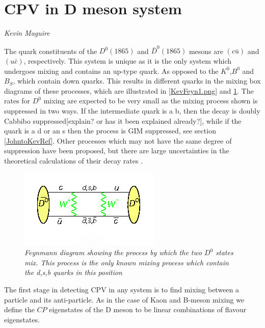 \section{CPV in D meson system}
\vspace{-1.0em}
\begin{center}
\tiny{\textit{Kevin Maguire}}
\end{center}

The quark constituents of the $D^{0}(1865)$ and $\bar{D}^{0}(1865)$ mesons are $(c \bar{u})$ and $(u \bar{c})$, respectively. This system is unique as it is the only system which undergoes mixing and contains an up-type quark. As opposed to the $K^{0}$,$B^{0}$ and $B_{S}$, which contain down quarks. This results in different quarks in the mixing box diagrams of these processes, which are illustrated in \cref{KevFeyn1.png} and \cref{Deon_Mixing_Feyn}. The rates for $D^0$ mixing are expected to be very small as the mixing process shown is suppressed in two ways. If the intermediate quark is a b, then the decay is doubly Cabbibo suppressed[explain? or has it been explained already?], while if the quark is a d or an s then the process is GIM suppressed, see section \ref{JohntoKevRef}. Other processes which may not have the same degree of suppression have been proposed, but there are large uncertainties in the theoretical calculations of their decay rates \cite{Babar_D0_Review}.    

\begin{figure}[h!]
\begin{center}
\includegraphics[scale=0.8]{figs/Deon_mixing_feyn.png}
\end{center}
\caption{\textit{Feynmann diagram showing the process by which the two $D^{0}$ states mix. This process is the only known mixing process which contain the d,s,b quarks in this position \cite{Deon_Mixing_Feyn}}}
\label{Deon_Mixing_Feyn}
\end{figure}

The first stage in detecting CPV in any system is to find mixing between a particle and its anti-particle. As in the case of Kaon and B-meson mixing we define the $CP$ eigenstates of the D meson to be linear combinations of flavour eigenstates.


